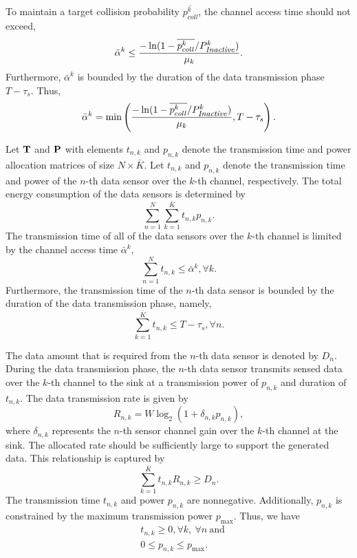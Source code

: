 \documentclass[journal]{IEEEtran} \ifCLASSINFOpdf
\begin{document}
To maintain a target collision probability $\overline{p_{coll}^k}$, the channel access time should not exceed,
\begin{equation}
\bar{\alpha}^{k} \leq \frac{-\ln (1- \overline{p_{coll}^k}/P_{\mbox{\footnotesize \textit{Inactive}}}^k)}{\mu_k}.
\end{equation}
Furthermore, $\bar{\alpha}^{k} $ is bounded by the duration of the data transmission phase $T - \tau_s$. Thus,
\begin{equation}
\bar{\alpha}^{k} = \min \left(\frac{-\ln(1- \overline{p_{coll}^k}/P_{\mbox{\footnotesize \textit{Inactive}}}^k)}{\mu_k}, T - \tau_s \right).
\end{equation}

Let $\bf{T}$ and $\bf{P}$ with elements $t_{n,k}$ and $p_{n,k}$ denote the transmission time and power allocation matrices of size $N \times \bar{K}$. Let $t_{n,k}$ and $p_{n,k}$ denote the transmission time and power of the $n$-th data sensor over the $k$-th channel, respectively. The total energy consumption of the data sensors is determined by
\begin{equation}\label{jatp_a}
 \sum_{n=1}^N \sum_{k=1}^{\bar{K}} t_{n,k} p_{n,k}.
\end{equation}
The transmission time of all of the data sensors over the $k$-th channel is limited by the channel access time $\bar{\alpha}^k$,
\begin{equation} \label{jatp_b}
\sum_{n=1}^N t_{n,k} \leq \bar{\alpha}^k, \forall k.
\end{equation}
Furthermore, the transmission time of the $n$-th data sensor is bounded by the duration of the data transmission phase, namely,
\begin{equation}\label{jatp_c}
\sum_{k=1}^{\bar{K}} t_{n, k} \leq T-\tau_s, \forall n.
\end{equation}

The data amount that is required from the $n$-th data sensor is denoted by $D_{n}$. During the data transmission phase, the $n$-th data sensor transmits sensed data over the $k$-th channel to the sink at a transmission power of $p_{n,k}$ and duration of $t_{n, k}$. The data transmission rate is given by
\begin{equation}
\label{eqn_shannon}
R_{n,k} = W \log_2 \left(1+ \delta_{n,k} p_{n,k} \right),
\end{equation}
where $\delta_{n,k}$ represents the $n$-th sensor channel gain over the $k$-th channel at the sink. The allocated rate should be sufficiently large to support the generated data. This relationship is captured by
\begin{equation}\label{jatp_d}
\sum_{k=1}^{\bar{K}} t_{n, k} R_{n,k} \geq D_n.
\end{equation}
The transmission time $t_{n,k}$ and power $p_{n,k}$ are nonnegative. Additionally, $p_{n,k}$ is constrained by the maximum transmission power $p_{\max}$. Thus, we have
\begin{align}
&t_{n,k}  \geq 0, \forall k, ~\forall n ~\mbox{and} \label{jatp_e} \\
&0  \leq p_{n,k} \leq p_{\max} \label{jatp_f}.
\end{align}
\end{document}
